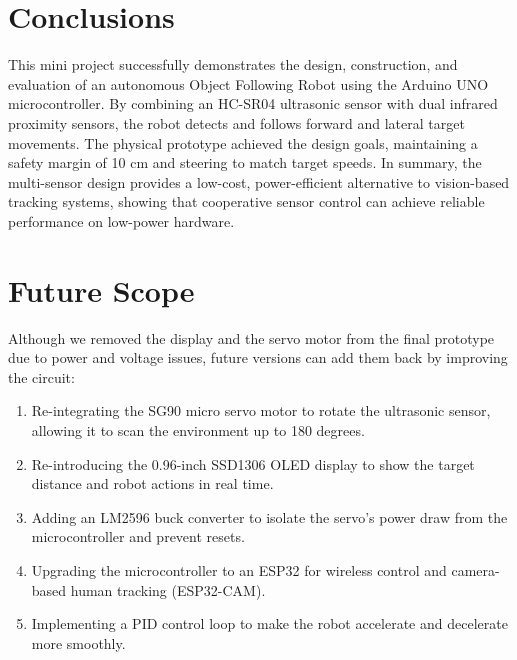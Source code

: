 \documentclass[12pt,a4paper,oneside]{report}
\begin{document}
\section{Conclusions}
This mini project successfully demonstrates the design, construction, and evaluation of an autonomous Object Following Robot using the Arduino UNO microcontroller. By combining an HC-SR04 ultrasonic sensor with dual infrared proximity sensors, the robot detects and follows forward and lateral target movements. The physical prototype achieved the design goals, maintaining a safety margin of 10 cm and steering to match target speeds. In summary, the multi-sensor design provides a low-cost, power-efficient alternative to vision-based tracking systems, showing that cooperative sensor control can achieve reliable performance on low-power hardware.

\section{Future Scope}
Although we removed the display and the servo motor from the final prototype due to power and voltage issues, future versions can add them back by improving the circuit:
\begin{enumerate}[noitemsep,topsep=2pt,parsep=0pt,partopsep=0pt]
    \item Re-integrating the SG90 micro servo motor to rotate the ultrasonic sensor, allowing it to scan the environment up to 180 degrees.
    \item Re-introducing the 0.96-inch SSD1306 OLED display to show the target distance and robot actions in real time.
    \item Adding an LM2596 buck converter to isolate the servo's power draw from the microcontroller and prevent resets.
    \item Upgrading the microcontroller to an ESP32 for wireless control and camera-based human tracking (ESP32-CAM).
    \item Implementing a PID control loop to make the robot accelerate and decelerate more smoothly.
\end{enumerate}
\clearpage
\end{document}
